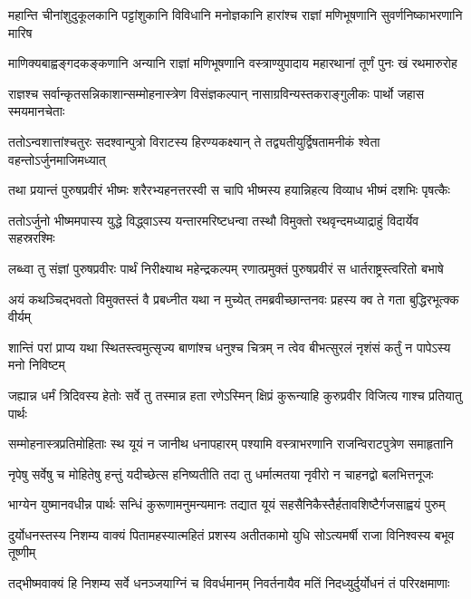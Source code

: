 \twolineshloka
{महान्ति चीनांशुदुकूलकानि पट्टांशुकानि विविधानि मनोज्ञकानि}
{हारांश्च राज्ञां मणिभूषणानि सुवर्णनिष्काभरणानि मारिष}


\twolineshloka
{माणिक्यबाह्वङ्गदकङ्कणानि अन्यानि राज्ञां मणिभूषणानि}
{वस्त्राण्युपादाय महारथानां तूर्णं पुनः खं रथमारुरोह}


\twolineshloka
{राज्ञश्च सर्वान्कृतसन्निकाशान्सम्मोहनास्त्रेण विसंज्ञकल्पान्}
{नासाग्रविन्यस्तकराङ्गुलीकः पार्थो जहास स्मयमानचेताः}


\twolineshloka
{ततोऽन्वशात्तांश्चतुरः सदश्वान्पुत्रो विराटस्य हिरण्यकक्ष्यान्}
{ते तद्व्यतीयुर्द्विषतामनीकं श्वेता वहन्तोऽर्जुनमाजिमध्यात्}


\twolineshloka
{तथा प्रयान्तं पुरुषप्रवीरं भीष्मः शरैरभ्यहनत्तरस्वी}
{स चापि भीष्मस्य हयान्निहत्य विव्याध भीष्मं दशभिः पृषत्कैः}


\twolineshloka
{ततोऽर्जुनो भीष्ममपास्य युद्धे विद्ध्वाऽस्य यन्तारमरिष्टधन्वा}
{तस्थौ विमुक्तो रथवृन्दमध्याद्राहुं विदार्येव सहस्ररश्मिः}


\twolineshloka
{लब्ध्वा तु संज्ञां पुरुषप्रवीरः पार्थं निरीक्ष्याथ महेन्द्रकल्पम्}
{रणात्प्रमुक्तं पुरुषप्रवीरं स धार्तराष्ट्रस्त्वरितो बभाषे}


\twolineshloka
{अयं कथञ्चिद्भवतो विमुक्तस्तं वै प्रबध्नीत यथा न मुच्येत्}
{तमब्रवीच्छान्तनवः प्रहस्य क्व ते गता बुद्धिरभूत्क्क वीर्यम्}


\twolineshloka
{शान्तिं परां प्राप्य यथा स्थितस्त्वमुत्सृज्य बाणांश्च धनुश्च चित्रम्}
{न त्वेव बीभत्सुरलं नृशंसं कर्तुं न पापेऽस्य मनो निविष्टम्}


\twolineshloka
{जह्यान्न धर्मं त्रिदिवस्य हेतोः सर्वे तु तस्मान्न हता रणेऽस्मिन्}
{क्षिप्रं कुरून्याहि कुरुप्रवीर विजित्य गाश्च प्रतियातु पार्थः}


\twolineshloka
{सम्मोहनास्त्रप्रतिमोहिताः स्थ यूयं न जानीथ धनापहारम्}
{पश्यामि वस्त्राभरणानि राजन्विराटपुत्रेण समाहृतानि}


\twolineshloka
{नृपेषु सर्वेषु च मोहितेषु हन्तुं यदीच्छेत्स हनिष्यतीति}
{तदा तु धर्मात्मतया नृवीरो न चाहनद्वो बलभित्तनूजः}


\twolineshloka
{भाग्येन युष्मानवधीन्न पार्थः सन्धिं कुरूणामनुमन्यमानः}
{तद्यात यूयं सहसैनिकैस्तैर्हतावशिष्टैर्गजसाह्वयं पुरुम्}



\twolineshloka
{दुर्योधनस्तस्य निशम्य वाक्यं पितामहस्यात्महितं प्रशस्य}
{अतीतकामो युधि सोऽत्यमर्षी राजा विनिश्वस्य बभूव तूष्णीम्}


\twolineshloka
{तद्भीष्मवाक्यं हि निशम्य सर्वे धनञ्जयाग्निं च विवर्धमानम्}
{निवर्तनायैव मतिं निदध्युर्दुर्योधनं तं परिरक्षमाणाः}


